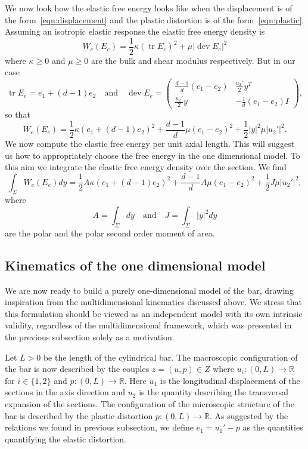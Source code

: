 \documentclass[a4paper,10pt,oneside]{amsbook}
\numberwithin{section}{chapter}
\numberwithin{equation}{chapter}
\theoremstyle{definition}
\DeclareMathOperator{\dev}{dev}
\DeclareMathOperator{\tr}{tr}
\begin{document}
We now look how the elastic free energy looks like when the displacement is of the form~\eqref{eqn:displacement} and the plastic distortion is of the form~\eqref{eqn:plastic}. Assuming an isotropic elastic response the elastic free energy density is
\[
W_e(E_e)=\frac{1}{2}\kappa(\tr E_e)^2+\mu|\dev E_e|^2
\]
where $\kappa\ge0$ and $\mu\ge0$ are the bulk and shear modulus respectively. But in our case
\[
\tr E_e=e_1+(d-1)e_2\quad\text{and}\quad\dev E_e=\begin{pmatrix}
\frac{d-1}{d}(e_1-e_2) & \frac{u_2'}{2}y^T \\
\frac{u_2'}{2}y & -\frac{1}{d}(e_1-e_2)I
\end{pmatrix},
\]
so that
\[
W_e(E_e)=\frac{1}{2}\kappa\left(e_1+(d-1)e_2\right)^2+\frac{d-1}{d}\mu(e_1-e_2)^2+\frac{1}{2}|y|^2\mu|u_2'|^2.
\]
We now compute the elastic free energy per unit axial length. This will suggest us how to appropriately choose the free energy in the one dimensional model. To this aim we integrate the elastic free energy density over the section. We find
\begin{equation}
\label{eqn:necking-small:constitutive-multidimensional}
\int_\Sigma W_e(E_e)dy=\frac{1}{2}A\kappa\left(e_1+(d-1)e_2\right)^2+\frac{d-1}{d}A\mu(e_1-e_2)^2+\frac{1}{2}J\mu|u_2'|^2,
\end{equation}
where
\[
A=\int_\Sigma dy\quad\text{and}\quad J=\int_\Sigma|y|^2dy
\]
are the polar and the polar second order moment of area.

\subsection{Kinematics of the one dimensional model}

We are now ready to build a purely one-dimensional model of the bar, drawing inspiration from the multidimensional kinematics discussed above. We stress that this formulation should be viewed as an independent model with its own intrinsic validity, regardless of the multidimensional framework, which was presented in the previous subsection solely as a motivation.

Let $L>0$ be the length of the cylindrical bar. The macroscopic configuration of the bar is now described by the couples $z=(u,p)\in Z$ where $u_i\colon(0,L)\to\mathbb{R}$ for $i\in\{1,2\}$ and $p\colon(0,L)\to\mathbb{R}$. Here $u_1$ is the longitudinal displacement of the sections in the axis direction and $u_2$ is the quantity describing the transversal expansion of the sections. The configuration of the microscopic structure of the bar is described by the plastic distortion $p\colon(0,L)\to\mathbb{R}$. As suggested by the relations we found in previous subsection, we define $e_1=u_1'-p$ as the quantities quantifying the elastic distortion.
\end{document}
